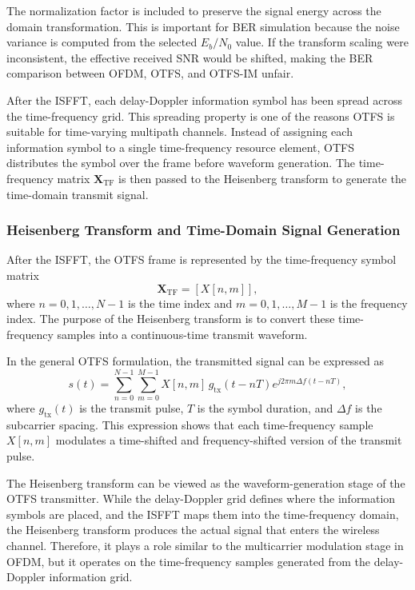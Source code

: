 The normalization factor is included to preserve the signal energy across the domain transformation. This is important for BER simulation because the noise variance is computed from the selected \(E_b/N_0\) value. If the transform scaling were inconsistent, the effective received SNR would be shifted, making the BER comparison between OFDM, OTFS, and OTFS-IM unfair.

After the ISFFT, each delay-Doppler information symbol has been spread across the time-frequency grid. This spreading property is one of the reasons OTFS is suitable for time-varying multipath channels. Instead of assigning each information symbol to a single time-frequency resource element, OTFS distributes the symbol over the frame before waveform generation. The time-frequency matrix \(\mathbf{X}_{\mathrm{TF}}\) is then passed to the Heisenberg transform to generate the time-domain transmit signal.

\subsubsection{Heisenberg Transform and Time-Domain Signal Generation}

After the ISFFT, the OTFS frame is represented by the time-frequency symbol matrix
\begin{equation}
    \mathbf{X}_{\mathrm{TF}} = [X[n,m]],
\end{equation}
where \(n=0,1,\ldots,N-1\) is the time index and \(m=0,1,\ldots,M-1\) is the frequency index. The purpose of the Heisenberg transform is to convert these time-frequency samples into a continuous-time transmit waveform.

In the general OTFS formulation, the transmitted signal can be expressed as
\begin{equation}
    s(t)
    =
    \sum_{n=0}^{N-1}
    \sum_{m=0}^{M-1}
    X[n,m]\,
    g_{\mathrm{tx}}(t-nT)
    e^{j2\pi m\Delta f(t-nT)},
    \label{eq:heisenberg_transform}
\end{equation}
where \(g_{\mathrm{tx}}(t)\) is the transmit pulse, \(T\) is the symbol duration, and \(\Delta f\) is the subcarrier spacing. This expression shows that each time-frequency sample \(X[n,m]\) modulates a time-shifted and frequency-shifted version of the transmit pulse.

The Heisenberg transform can be viewed as the waveform-generation stage of the OTFS transmitter. While the delay-Doppler grid defines where the information symbols are placed, and the ISFFT maps them into the time-frequency domain, the Heisenberg transform produces the actual signal that enters the wireless channel. Therefore, it plays a role similar to the multicarrier modulation stage in OFDM, but it operates on the time-frequency samples generated from the delay-Doppler information grid.

